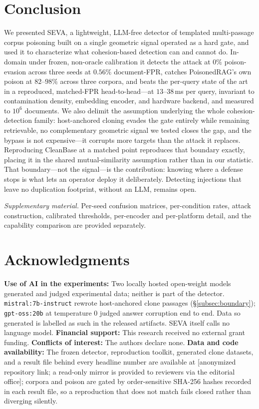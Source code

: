 \documentclass[10pt,journal,compsoc]{IEEEtran}
\newcommand{\ANONREPO}{[anonymized repository link; a read-only mirror is provided to reviewers via the editorial office]}
\begin{document}
\section{Conclusion}
We presented SEVA, a lightweight, LLM-free detector of templated multi-passage corpus
poisoning built on a single geometric signal operated as a hard gate, and used it to
characterize what cohesion-based detection can and cannot do. In-domain under frozen,
non-oracle calibration it detects the attack at $0\%$ poison-evasion across three seeds at
$0.56\%$ document-FPR, catches PoisonedRAG's own poison at $82$--$98\%$ across three corpora,
and beats the per-query state of the art in a reproduced, matched-FPR head-to-head---at
$13$--$38$\,ms per query, invariant to contamination density, embedding encoder, and hardware
backend, and measured to $10^6$ documents. We also delimit the assumption underlying the whole
cohesion-detection family: host-anchored cloning evades the gate entirely while remaining
retrievable, no complementary geometric signal we tested closes the gap, and the bypass is not
expensive---it corrupts more targets than the attack it replaces. Reproducing CleanBase at a
matched point reproduces that boundary exactly, placing it in the shared mutual-similarity
assumption rather than in our statistic. That boundary---not the signal---is the contribution:
knowing where a defense stops is what lets an operator deploy it deliberately. Detecting
injections that leave no duplication footprint, without an LLM, remains open.

\noindent\emph{Supplementary material.} Per-seed confusion matrices, per-condition rates,
attack construction, calibrated thresholds, per-encoder and per-platform detail, and the
capability comparison are provided separately.

\section*{Acknowledgments}
\textbf{Use of AI in the experiments:} Two locally hosted open-weight models generated and judged experimental data; neither is part of the detector. \texttt{mistral:7b-instruct} rewrote host-anchored clone passages (\S\ref{subsec:boundary}); \texttt{gpt-oss:20b} at temperature $0$ judged answer corruption end to end. Data so generated is labelled as such in the released artifacts. SEVA itself calls no language model.
\textbf{Financial support:} This research received no external grant funding. \textbf{Conflicts of interest:} The authors declare none. \textbf{Data and code availability:} The frozen detector, reproduction toolkit, generated clone datasets, and a result file behind every headline number are available at \ANONREPO{}; corpora and poison are gated by order-sensitive SHA-256 hashes recorded in each result file, so a reproduction that does not match fails closed rather than diverging silently.
\end{document}
